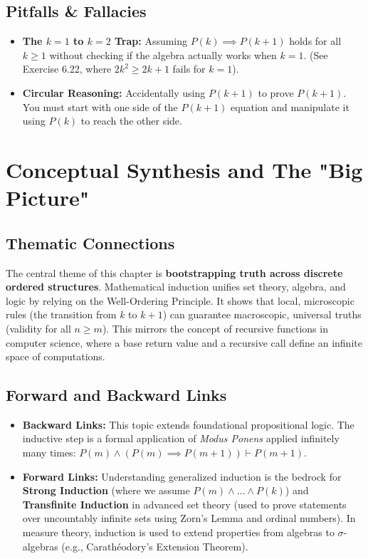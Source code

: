 \documentclass[11pt, a4paper]{article}
\theoremstyle{definition}
\theoremstyle{remark}
\begin{document}
\subsection{Pitfalls \& Fallacies}
\begin{itemize}
    \item \textbf{The $k=1$ to $k=2$ Trap:} Assuming $P(k) \implies P(k+1)$ holds for all $k \ge 1$ without checking if the algebra actually works when $k=1$. (See Exercise 6.22, where $2k^2 \ge 2k+1$ fails for $k=1$).
    \item \textbf{Circular Reasoning:} Accidentally using $P(k+1)$ to prove $P(k+1)$. You must start with one side of the $P(k+1)$ equation and manipulate it using $P(k)$ to reach the other side.
\end{itemize}

\newpage

\section{Conceptual Synthesis and The "Big Picture"}

\subsection{Thematic Connections}
The central theme of this chapter is \textbf{bootstrapping truth across discrete ordered structures}. Mathematical induction unifies set theory, algebra, and logic by relying on the Well-Ordering Principle. It shows that local, microscopic rules (the transition from $k$ to $k+1$) can guarantee macroscopic, universal truths (validity for all $n \ge m$). This mirrors the concept of recursive functions in computer science, where a base return value and a recursive call define an infinite space of computations.

\subsection{Forward and Backward Links}
\begin{itemize}
    \item \textbf{Backward Links:} This topic extends foundational propositional logic. The inductive step is a formal application of \textit{Modus Ponens} applied infinitely many times: $P(m) \land (P(m) \implies P(m+1)) \vdash P(m+1)$.
    \item \textbf{Forward Links:} Understanding generalized induction is the bedrock for \textbf{Strong Induction} (where we assume $P(m) \land \dots \land P(k)$) and \textbf{Transfinite Induction} in advanced set theory (used to prove statements over uncountably infinite sets using Zorn's Lemma and ordinal numbers). In measure theory, induction is used to extend properties from algebras to $\sigma$-algebras (e.g., Carathéodory's Extension Theorem).
\end{itemize}
\end{document}
